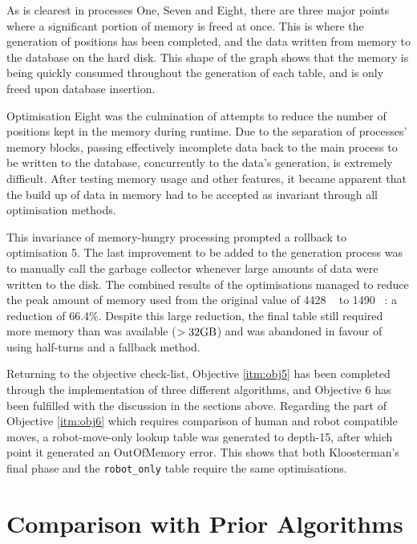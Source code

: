 \documentclass{report}
\newcommand{\depth}[1]{depth-#1}
\begin{document}
    As is clearest in processes One, Seven and Eight, there are three major points where a significant portion of memory is freed at once. This is where the generation of positions has been completed, and the data written from memory to the database on the hard disk. This shape of the graph shows that the memory is being quickly consumed throughout the generation of each table, and is only freed upon database insertion.
    
    Optimisation Eight was the culmination of attempts to reduce the number of positions kept in the memory during runtime. Due to the separation of processes' memory blocks, passing effectively incomplete data back to the main process to be written to the database, concurrently to the data's generation, is extremely difficult. After testing memory usage and other features, it became apparent that the build up of data in memory had to be accepted as invariant through all optimisation methods.
    
    This invariance of memory-hungry processing prompted a rollback to optimisation 5. The last improvement to be added to the generation process was to manually call the garbage collector whenever large amounts of data were written to the disk. The combined results of the optimisations managed to reduce the peak amount of memory used from the original value of \num{4428} \si{\mega\byte} to \num{1490} \si{\mega\byte}: a reduction of 66.4\%. Despite this large reduction, the final table still required more memory than was available ($> 32 \si{\giga\byte}$) and was abandoned in favour of using half-turns and a fallback method.
    
    Returning to the objective check-list, Objective \ref{itm:obj5} has been completed through the implementation of three different algorithms, and Objective 6 has been fulfilled with the discussion in the sections above. Regarding the part of Objective \ref{itm:obj6} which requires comparison of human and robot compatible moves, a robot-move-only lookup table was generated to \depth{15}, after which point it generated an OutOfMemory error. This shows that both Kloosterman's final phase and the \lstinline|robot_only| table require the same optimisations.
         
	\section{Comparison with Prior Algorithms}
	
\end{document}
